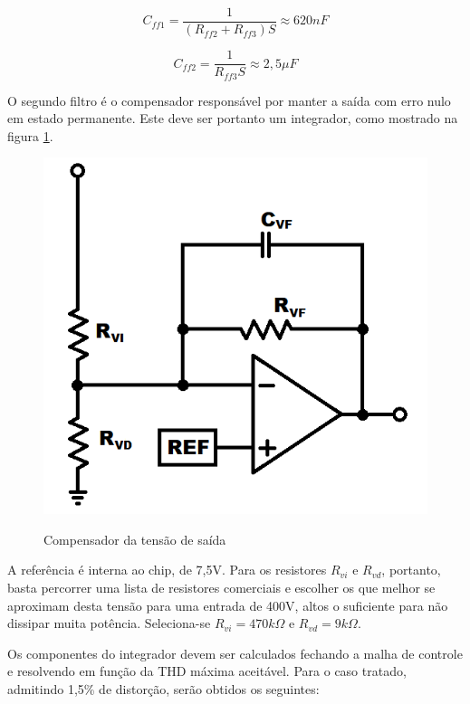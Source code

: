 \documentclass[
        12pt,
        openany, %
        oneside, %
        a4paper,			
        english,			
        brazil
        ]{abntbibufjf}
\begin{document}
\begin{equation}
C_{ff1}=\frac{1}{(R_{ff2}+R_{ff3})S}\approx 620nF
\end{equation}

\begin{equation}
C_{ff2}=\frac{1}{R_{ff3}S}\approx 2,5 \mu F
\end{equation}


O segundo filtro é o compensador responsável por manter a saída com erro nulo em estado permanente. Este deve ser portanto um integrador, como mostrado na figura \ref{vfo}.

\begin{figure}[!h]
	\centering
	\caption{Compensador da tensão de saída}
	\includegraphics[scale=.5]{../ESQUEMAS/vfo.png}\\
	\label{vfo}
\end{figure}

A referência é interna ao chip, de 7,5V. Para os resistores $R_{vi}$ e $R_{vd}$, portanto, basta percorrer uma lista de resistores comerciais e escolher os que melhor se aproximam desta tensão para uma entrada de 400V, altos o suficiente para não dissipar muita potência. Seleciona-se $R_{vi}=470k\Omega$ e $R_{vd}=9k\Omega$.

Os componentes do integrador devem ser calculados fechando a malha de controle e resolvendo em função da THD máxima aceitável. Para o caso tratado, admitindo 1,5\% de distorção, serão obtidos os seguintes:
\end{document}
